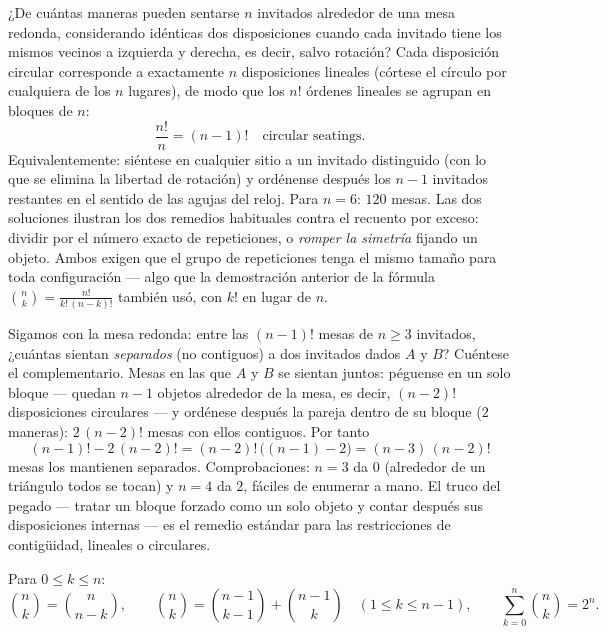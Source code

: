 \begin{example}\label{ex:b1:counting:roundtable}
¿De cuántas maneras pueden sentarse $n$ invitados alrededor de una mesa
redonda, considerando idénticas dos disposiciones cuando cada invitado
tiene los mismos vecinos a izquierda y derecha, es decir, salvo
rotación? Cada disposición circular corresponde a exactamente $n$
disposiciones lineales (córtese el círculo por cualquiera de los $n$
lugares), de modo que los $n!$ órdenes lineales se agrupan en bloques
de $n$:
\[
\frac{n!}{n} = (n-1)! \quad\text{circular seatings.}
\]
Equivalentemente: siéntese en cualquier sitio a un invitado
distinguido (con lo que se elimina la libertad de rotación) y
ordénense después los $n - 1$ invitados restantes en el sentido de las
agujas del reloj. Para $n = 6$: $120$ mesas. Las dos soluciones
ilustran los dos remedios habituales contra el recuento por exceso:
dividir por el número exacto de repeticiones, o \emph{romper la
simetría} fijando un objeto. Ambos exigen que el grupo de repeticiones
tenga el mismo tamaño para toda configuración --- algo que la
demostración anterior de la fórmula $\binom nk = \frac{n!}{k!\,(n-k)!}$
también usó, con $k!$ en lugar de $n$.
\end{example}

\begin{example}\label{ex:b1:counting:constraint}
Sigamos con la mesa redonda: entre las $(n-1)!$ mesas de $n \geq 3$
invitados, ¿cuántas sientan \emph{separados} (no contiguos) a dos
invitados dados $A$ y $B$? Cuéntese el complementario. Mesas en las que
$A$ y $B$ se sientan juntos: péguense en un solo bloque --- quedan
$n - 1$ objetos alrededor de la mesa, es decir, $(n-2)!$ disposiciones
circulares --- y ordénese después la pareja dentro de su bloque ($2$
maneras): $2\,(n-2)!$ mesas con ellos contiguos. Por tanto
\[
(n-1)! - 2\,(n-2)! = (n-2)!\,\bigl((n - 1) - 2\bigr)
= (n-3)\,(n-2)!
\]
mesas los mantienen separados. Comprobaciones: $n = 3$ da $0$
(alrededor de un triángulo todos se tocan) y $n = 4$ da $2$, fáciles de
enumerar a mano. El truco del pegado --- tratar un bloque forzado como
un solo objeto y contar después sus disposiciones internas --- es el
remedio estándar para las restricciones de contigüidad, lineales o
circulares.
\end{example}

\begin{proposition}\label{prop:b1:counting:identities}
Para $0 \leq k \leq n$:
\[
\binom{n}{k} = \binom{n}{n-k},
\qquad
\binom{n}{k} = \binom{n-1}{k-1} + \binom{n-1}{k}
\quad (1 \leq k \leq n-1),
\qquad
\sum_{k=0}^{n} \binom{n}{k} = 2^n .
\]
\end{proposition}

